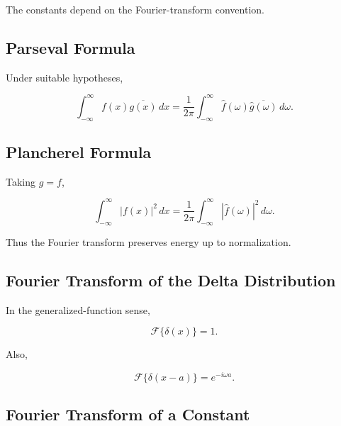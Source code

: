 The constants depend on the Fourier-transform convention.

\subsection{Parseval Formula}
\label{subsec:fourier-parseval-transform}

Under suitable hypotheses,

\[
\boxed{
\int_{-\infty}^{\infty}
f(x)
\overline{g(x)}
\,dx
=
\frac{1}{2\pi}
\int_{-\infty}^{\infty}
\widehat f(\omega)
\overline{
\widehat g(\omega)
}
\,d\omega.
}
\]

\subsection{Plancherel Formula}
\label{subsec:plancherel-transform-reference}

Taking \(g=f\),

\[
\boxed{
\int_{-\infty}^{\infty}
|f(x)|^2
\,dx
=
\frac{1}{2\pi}
\int_{-\infty}^{\infty}
|\widehat f(\omega)|^2
\,d\omega.
}
\]

Thus the Fourier transform preserves energy up to normalization.

\subsection{Fourier Transform of the Delta Distribution}
\label{subsec:fourier-delta-reference}

In the generalized-function sense,

\[
\boxed{
\mathcal{F}\{\delta(x)\}
=
1.
}
\]

Also,

\[
\boxed{
\mathcal{F}\{\delta(x-a)\}
=
e^{-i\omega a}.
}
\]

\subsection{Fourier Transform of a Constant}
\label{subsec:fourier-constant-distribution}

